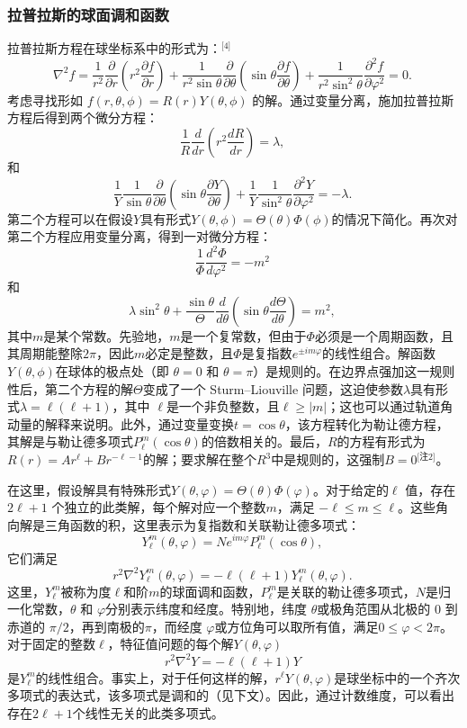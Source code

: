 \subsubsection{拉普拉斯的球面调和函数}
拉普拉斯方程在球坐标系中的形式为：\(^\text{[4]}\)
\[
\nabla^2 f = \frac{1}{r^2} \frac{\partial}{\partial r} \left( r^2 \frac{\partial f}{\partial r} \right) + \frac{1}{r^2 \sin \theta} \frac{\partial}{\partial \theta} \left( \sin \theta \frac{\partial f}{\partial \theta} \right) + \frac{1}{r^2 \sin^2 \theta} \frac{\partial^2 f}{\partial \varphi^2} = 0.~
\]
考虑寻找形如 \( f(r, \theta, \phi) = R(r) Y(\theta, \phi) \) 的解。通过变量分离，施加拉普拉斯方程后得到两个微分方程：
\[
\frac{1}{R} \frac{d}{dr} \left( r^2 \frac{dR}{dr} \right) = \lambda,~
\]
和
\[
\frac{1}{Y} \frac{1}{\sin \theta} \frac{\partial}{\partial \theta} \left( \sin \theta \frac{\partial Y}{\partial \theta} \right) + \frac{1}{Y} \frac{1}{\sin^2 \theta} \frac{\partial^2 Y}{\partial \varphi^2} = -\lambda.~
\]
第二个方程可以在假设\( Y \)具有形式\( Y(\theta, \phi) = \Theta(\theta) \Phi(\phi) \)的情况下简化。再次对第二个方程应用变量分离，得到一对微分方程：
\[
\frac{1}{\Phi} \frac{d^2 \Phi}{d \varphi^2} = -m^2~
\]
和
\[
\lambda \sin^2 \theta + \frac{\sin \theta}{\Theta} \frac{d}{d\theta} \left( \sin \theta \frac{d \Theta}{d \theta} \right) = m^2,~
\]
其中\( m \)是某个常数。先验地，\( m \)是一个复常数，但由于\( \Phi \)必须是一个周期函数，且其周期能整除\( 2\pi \)，因此\( m \)必定是整数，且\( \Phi \)是复指数\( e^{\pm im\varphi} \)的线性组合。解函数\( Y(\theta, \phi) \)在球体的极点处（即 \( \theta = 0 \) 和 \( \theta = \pi \)）是规则的。在边界点强加这一规则性后，第二个方程的解\( \Theta \)变成了一个 Sturm–Liouville 问题，这迫使参数\( \lambda \)具有形式\( \lambda = \ell (\ell + 1) \)，其中 \( \ell \)是一个非负整数，且\( \ell \geq |m| \)；这也可以通过轨道角动量的解释来说明。此外，通过变量变换\( t = \cos \theta \)，该方程转化为勒让德方程，其解是与勒让德多项式\( P_{\ell}^m(\cos \theta) \)的倍数相关的。最后，\( R \)的方程有形式为\( R(r) = A r^\ell + B r^{-\ell - 1} \)的解；要求解在整个\( R^3 \)中是规则的，这强制\( B = 0 \)\(^\text{[注2]}\)。

在这里，假设解具有特殊形式\( Y(\theta, \varphi) = \Theta(\theta) \Phi(\varphi) \)。对于给定的\( \ell \) 值，存在 \( 2\ell + 1 \) 个独立的此类解，每个解对应一个整数\( m \)，满足 \( -\ell \leq m \leq \ell \)。这些角向解是三角函数的积，这里表示为复指数和关联勒让德多项式：
\[
Y_{\ell}^{m}(\theta, \varphi) = N e^{im\varphi} P_{\ell}^{m}(\cos \theta),~
\]
它们满足
\[
r^2 \nabla^2 Y_{\ell}^{m}(\theta, \varphi) = -\ell (\ell + 1) Y_{\ell}^{m}(\theta, \varphi).~
\]
这里，\( Y_{\ell}^m \)被称为度\( \ell \)和阶\( m \)的球面调和函数，\( P_{\ell}^m \)是关联的勒让德多项式，\( N \)是归一化常数，\( \theta \) 和 \( \varphi \)分别表示纬度和经度。特别地，纬度 \( \theta \)或极角范围从北极的 0 到赤道的 \( \pi/2 \)，再到南极的\( \pi \)，而经度 \( \varphi \)或方位角可以取所有值，满足\( 0 \leq \varphi < 2\pi \)。对于固定的整数\( \ell \)，特征值问题的每个解\( Y(\theta, \varphi) \)
\[
r^2 \nabla^2 Y = -\ell (\ell + 1) Y~
\]
是\( Y_{\ell}^m \)的线性组合。事实上，对于任何这样的解，\( r^\ell Y(\theta, \varphi) \)是球坐标中的一个齐次多项式的表达式，该多项式是调和的（见下文）。因此，通过计数维度，可以看出存在\( 2\ell + 1 \)个线性无关的此类多项式。

